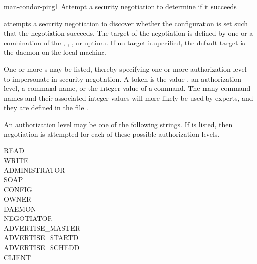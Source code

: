 \begin{ManPage}{}{man-condor-ping}{1}
{Attempt a security negotiation to determine if it succeeds}

\Synopsis {}
\ToolArgsBase


\Description
{} attempts a security negotiation to discover whether the
configuration is set such that the negotiation succeeds.
The target of the negotiation is defined by one or a combination of 
the , , , or  options.
If no target is specified,
the default target is the  daemon on the local machine.

One or more s may be listed,
thereby specifying one or more authorization level to impersonate in
security negotiation.
A token is the value , an authorization level,
a command name, or the integer value of a command.
The many command names and their associated integer values will more
likely be used by experts,
and they are defined in the file . 

An authorization level may be one of the following strings.
If  is listed, 
then negotiation is attempted for each of these possible authorization levels.
\begin{description}
\item[READ]
\item[WRITE]
\item[ADMINISTRATOR]
\item[SOAP]
\item[CONFIG]
\item[OWNER]
\item[DAEMON]
\item[NEGOTIATOR]
\item[ADVERTISE\_MASTER]
\item[ADVERTISE\_STARTD]
\item[ADVERTISE\_SCHEDD]
\item[CLIENT]
\end{description}


\end{ManPage}

